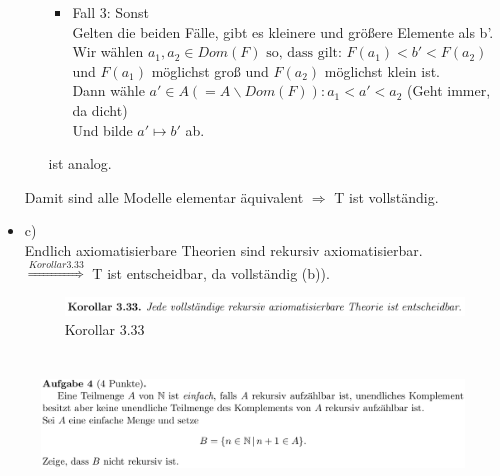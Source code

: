 \documentclass[a4paper]{scrartcl}%
\begin{document}
\begin{itemize}
\begin{itemize}
\begin{itemize}
\newpage

                        \item Fall 3: Sonst\\
                            Gelten die beiden Fälle, gibt es kleinere und größere Elemente als b'.\\
                            Wir wählen $a_1,a_2 \in Dom(F) \text{ so, dass gilt: } F(a_1) < b' < F(a_2)$\\
                            und $F(a_1)$ möglichst groß und $F(a_2)$ möglichst klein ist.\\
                            Dann wähle $a' \in A (=A\backslash Dom(F)): a_1 < a' < a_2$ (Geht immer, da dicht)\\
                            Und bilde $a' \mapsto b'$ ab.\\
                    \end{itemize}
                     ist analog.\\
            \end{itemize}
            Damit sind alle Modelle elementar äquivalent $\Rightarrow$ T ist vollständig.\\
        \item c)\\
            Endlich axiomatisierbare Theorien sind rekursiv axiomatisierbar.\\
            $\overset{Korollar 3.33}{\Rightarrow}$ T ist entscheidbar, da vollständig (b)).\\

            \begin{figure}[H]
                \centering
                \includegraphics[scale=0.3]{./K-3-33.png}
                \caption{Korollar 3.33}
                \label{fig:./K-3-33}
            \end{figure}
            

    \end{itemize}

\newpage

\section*{}%
\label{sec:aufgabe_4}

    \begin{figure}[H]
        \includegraphics[scale=0.3]{./A-4.png}
        \label{fig:}
    \end{figure}
\end{document}
